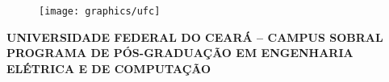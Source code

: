\documentclass[
	12pt,				%
	openright,			%
	oneside,			%
	a4paper,			%
	chapter=TITLE,		%
	section=TITLE,		%
	english,			%
	french,				%
	spanish,			%
	brazil				%
	]{abntex2}
\begin{document}
\frenchspacing 

\pretextual

\begin{figure}
\centering
\texttt{[image: graphics/ufc]}
\end{figure}

\begin{center}
\ABNTEXchapterfont\large
\textbf{UNIVERSIDADE FEDERAL DO CEARÁ -- CAMPUS SOBRAL} \\
\textbf{PROGRAMA DE PÓS-GRADUAÇÃO EM ENGENHARIA ELÉTRICA E DE COMPUTAÇÃO} \\
\vspace{1cm}
\ABNTEXchapterfont\large

\end{center}

\vspace{1cm}

\imprimircapa


\setlength\parindent{0pt}

\begin{folhadeaprovacao}
	
	\begin{center}
		{\ABNTEXchapterfont\large\imprimirautor}
		
		\vspace{-8cm}
		
		\vspace*{\fill}\vspace*{\fill}
		\begin{center}
			\ABNTEXchapterfont\bfseries\Large\imprimirtitulo
		\end{center}
		\vspace*{\fill}
		
		\hspace{.45\textwidth}
		\begin{minipage}{.5\textwidth}
			\imprimirpreambulo
		\end{minipage}%
		\vspace*{\fill}
	\end{center}
	
	\vspace{-1cm}
	
	
\end{folhadeaprovacao}
\end{document}
